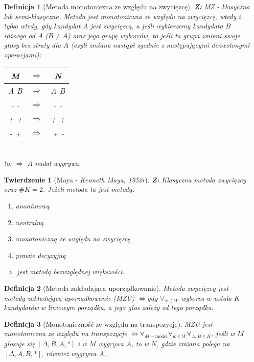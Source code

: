 \documentclass[12pt,a4paper]{article}
\theoremstyle{break}
\newtheorem{definition}{Definicja}[section]
\newtheorem{theorem}{Twierdzenie}[section]
\newcommand{\witw}{$\Leftrightarrow$}
\begin{document}
	\begin{definition}[Metoda monotoniczna ze względu na zwycięzcę]
		\textbf{Z:} MZ - klasyczna lub semi-klasyczna.
		Metoda jest monotoniczna ze względu na zwycięzcę, \textit{wtedy i tylko wtedy}, gdy kandydat $A$ jest zwycięzcą, a jeśli wybierzemy kandydata $B$ różnego od $A$ ($B\neq A$) oraz jego grupę wyborców, to jeśli ta grupa zmieni swoje głosy bez straty dla $A$ (czyli zmiana nastąpi zgodnie z następującymi dozwolonymi operacjami):\\
		
		\begin{tabular}{|c|c|c|}
			\hline
			M & $\Rightarrow$ & N \\\hline
			A B & $\Rightarrow$ & A B \\\hline
			- - & $\Rightarrow$ & - - \\\hline
			+ + & $\Rightarrow$ & + + \\\hline
			- + & $\Rightarrow$ & + - \\\hline
		\end{tabular}\\
		
		to: $\Rightarrow$ $A$ nadal wygrywa.
	\end{definition}

	\begin{theorem}[Maya - \textit{Kenneth Maya, 1952r}]
		\textbf{Z:} Klasyczna metoda zwycięzcy oraz $\# K = 2$. Jeżeli metoda ta jest metodą:
		\begin{enumerate}[(1)]
			\item anonimową
			\item neutralną
			\item monotoniczną ze względu na zwycięzcę
			\item prawie decyzyjną
		\end{enumerate}
		$\Rightarrow$ jest metodą bezwzględnej większości.
	\end{theorem}

	\begin{definition}[Metoda zakładająca uporządkowanie]
		Metoda zwycięzcy jest metodą zakładającą uporządkowanie (MZU) \witw gdy $\forall_{w\in W}$ wyborca $w$ ustala $K$ kandydatów w liniowym porządku, a jego głos zależy od tego porządku.
	\end{definition}

	\begin{definition}[Monotoniczność ze względu na transpozycję]
		MZU jest monotoniczna ze względu na transpozycje \witw $\forall_{M-\text{model}} \forall_{w\in W} \forall_{A,B\in K}$, jeśli w $M$ głosuje się $[\Delta, B, A, *]$ i w $M$ wygrywa $A$, to w $N$, gdzie zmiana polega na $[\Delta, A, B, *]$, również wygrywa $A$.
	\end{definition}
\end{document}
